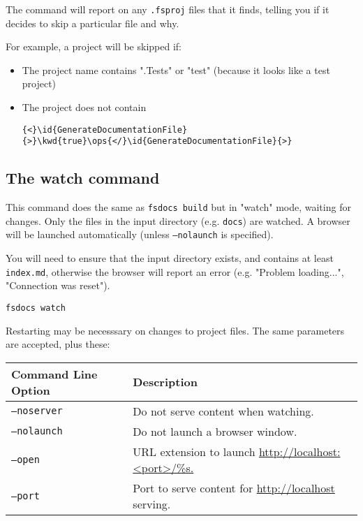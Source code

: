 \documentclass{article}
\newcommand{\id}[1]{\textcolor{black}{#1}}
\newcommand{\kwd}[1]{\textcolor{navy}{#1}}
\newcommand{\ops}[1]{\textcolor{purple}{#1}}
\begin{document}
The command will report on any \texttt{.fsproj} files that it finds, telling you if it decides to skip a particular file and why.


For example, a project will be skipped if:
\begin{itemize}
\item 

The project name contains ".Tests" or "test" (because it looks like a test project)

\item 

The project does not contain
\begin{Verbatim}[commandchars=\\\{\}]
{<}\id{GenerateDocumentationFile}{>}\kwd{true}\ops{</}\id{GenerateDocumentationFile}{>}

\end{Verbatim}


\end{itemize}

\subsection*{The watch command}



This command does the same as \texttt{fsdocs build} but in "watch" mode, waiting for changes. Only the files in the input
directory (e.g. \texttt{docs}) are watched. A browser will be launched automatically (unless \texttt{--nolaunch} is specified).


You will need to ensure that the input directory exists, and contains at least \texttt{index.md}, otherwise the browser will
report an error (e.g. "Problem loading...", "Connection was reset").
\begin{lstlisting}
fsdocs watch

\end{lstlisting}


Restarting may be necesssary on changes to project files. The same parameters are accepted, plus these:
\begin{tabular}{|l|l|}\hline
\textbf{Command Line Option} & \textbf{Description}\\ \hline\hline
\texttt{--noserver} & Do not serve content when watching.\\ \hline
\texttt{--nolaunch} & Do not launch a browser window.\\ \hline
\texttt{--open} & URL extension to launch \href{http://localhost:<port>/\%s.}{http://localhost:<port>/\%s.}\\ \hline
\texttt{--port} & Port to serve content for \href{http://localhost}{http://localhost} serving.\\ \hline
\end{tabular}
\end{document}

